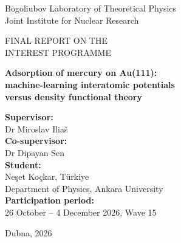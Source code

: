 \documentclass[11pt,a4paper]{article}
\newcommand{\Eads}{E_\mathrm{ads}}
\begin{document}
\begin{titlepage}
\centering
{\large Bogoliubov Laboratory of Theoretical Physics\\ Joint Institute for Nuclear Research\par}
\vspace{2.5cm}
{\Large FINAL REPORT ON THE\\ INTEREST PROGRAMME\par}
\vspace{1.5cm}
{\LARGE\bfseries Adsorption of mercury on Au(111):\\ machine-learning interatomic potentials\\ versus density functional theory\par}
\vspace{2.5cm}
\begin{flushright}
\textbf{Supervisor:}\\ Dr Miroslav Ilia\v{s}\\
\textbf{Co-supervisor:}\\ Dr Dipayan Sen\\[1em]
\textbf{Student:}\\ Ne\c{s}et Ko\c{c}kar, T\"urkiye\\ Department of Physics, Ankara University\\[1em]
\textbf{Participation period:}\\ 26 October -- 4 December 2026, Wave 15
\end{flushright}
\vfill
{\large Dubna, 2026\par}
\end{titlepage}

\tableofcontents
\newpage

\begin{abstract}
The adsorption of a single Hg atom on Au(111), the benchmark for gas-phase chemistry of copernicium on gold detectors, was computed with two universal machine-learning interatomic potentials (CHGNet, MACE-MP-0) and with plane-wave DFT (PBE and PBE-D3(BJ)) under one consistent protocol. The upstream ASE results were reproduced exactly. Both MLIPs bind Hg two to three times more strongly than the PBE level they were trained on ($\Eads(\mathrm{fcc}) = -0.94$ and $-0.77$~eV vs.\ $-0.33$~eV). This study shows that a large part of this overbinding comes from the untrained energy of the free Hg atom: its error, obtained through the Hg cohesive energy, is $+0.45$~eV for CHGNet and $+0.22$~eV for MACE. A ``far-away'' reference with Hg 10~\AA\ above the slab does not detect this error, because the atom has no neighbours inside the 6~\AA\ model cutoff. All methods agree on the site preference (fcc $\approx$ hcp $>$ bridge $>$ ontop), but the MLIPs exaggerate the site corrugation about threefold. PBE-D3 gives $\Eads = -0.69$~eV (66~kJ/mol), compared with the thermochromatographic $-\Delta H_\mathrm{ads} = 98\pm3$~kJ/mol; PBE alone gives only 32~kJ/mol.
\end{abstract}
\end{document}
